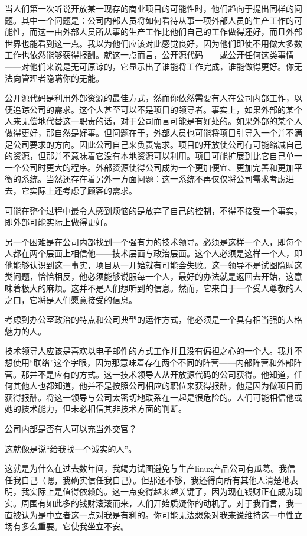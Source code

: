 当人们第一次听说开放某一现存的商业项目的可能性时，他们趋向于提出同样的问题。其中一个问题是：公司内部人员将如何看待从事一项外部人员的生产工作的可能性，而这一由外部人员所从事的生产工作比他们自己的工作做得还好，而且外部世界也能看到这一点。我以为他们应该对此感觉良好，因为他们即使不用做大多数工作也依然能够获得报酬。就这一点而言，公开源代码——或公开任何这类事情——对他们来说是无可原谅的，它显示出了谁能将工作完成，谁能做得更好。你无法向管理者隐瞒你的无能。

公开源代码是利用外部资源的最佳方式，然而你依然需要有人在公司内部工作，以便追踪公司的需求。这个人甚至可以不是项目的领导者。事实上，如果外部的某个人来无偿地代替这一职责的话，对于公司而言可能是有好处的。如果外部的某个人做得更好，那自然是好事。但问题在于，外部人员也可能将项目引导入一个并不满足公司要求的方向。因此公司自己来负责需求。项目的开放使公司有可能缩减自己的资源，但那并不意味着它没有本地资源可以利用。项目可能扩展到比它自己单一一个公司时更大的程序。外部资源使得公司成为一个更加便宜、更加完善和更加平衡的系统。当然还存在着另外一方面问题：这一系统不再仅仅将公司需求考虑进去，它实际上还考虑了顾客的需求。

可能在整个过程中最令人感到烦恼的是放弃了自己的控制，不得不接受一个事实，即外部可能实际上做得更好。

另一个困难是在公司内部找到一个强有力的技术领导。必须是这样一个人，即每个人都在两个层面上相信他——技术层面与政治层面。这个人必须是这样一个人，即他能够认识到这一事实，项目从一开始就有可能会失败。这一领导不是试图隐瞒这类问题，恰恰相反，他必须能够说服每一个人，最好的办法就是返回去开始，这意味着极大的麻烦。这并不是人们想听到的信息。然而，它来自于一个受人尊敬的人之口，它将是人们愿意接受的信息。

考虑到办公室政治的特点和公司典型的运作方式，他必须是一个具有相当强的人格魅力的人。

技术领导人应该是喜欢以电子邮件的方式工作并且没有偏袒之心的一个人。我并不想使用“联络”这个字眼，因为那意味着存在两个不同的阵营——内部阵营和外部阵营。那并不是应有的方式。这一技术领导人从开放源代码的公司获得。他知道，任何其他人也都知道，他并不是按照公司相应的职位来获得报酬，他是因为做项目而获得报酬。将这一领导与公司太密切地联系在一起是很危险的。人们可能相信他或她的技术能力，但未必相信其非技术方面的判断。

公司内部是否有人可以充当外交官？

这就像是说“给我找一个诚实的人”。

这就是为什么在过去数年间，我竭力试图避免与生产linux产品公司有瓜葛。我信任我自己（嗯，我确实信任我自己）。但那还不够，我还得向所有其他人清楚地表明，我实际上是值得依赖的。这一点变得越来越关键了，因为现在钱财正在成为现实。周围有如此多的钱财滚滚而来，人们开始质疑你的动机了。对于我而言，我一直被认为是中立者这一点对我是有利的。你可能无法想象对我来说维持这一中性立场有多么重要。它使我坐立不安。

